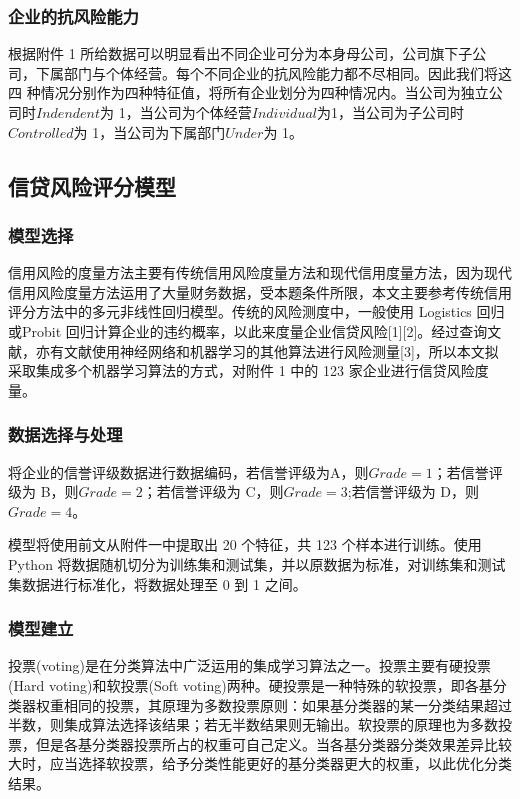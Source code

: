 \documentclass[UTF8]{ctexart}
\begin{document}
\subsubsection{企业的抗风险能力}

根据附件 1 所给数据可以明显看出不同企业可分为本身母公司，公司旗下子公
司，下属部门与个体经营。每个不同企业的抗风险能力都不尽相同。因此我们将这四
种情况分别作为四种特征值，将所有企业划分为四种情况内。当公司为独立公司时$Indendent$为 1，当公司为个体经营$Individual$为1，当公司为子公司时$Controlled$为 1，当公司为下属部门$Under$为 1。

\subsection{信贷风险评分模型}

\subsubsection{模型选择}

信用风险的度量方法主要有传统信用风险度量方法和现代信用度量方法，因为现代信用风险度量方法运用了大量财务数据，受本题条件所限，本文主要参考传统信用评分方法中的多元非线性回归模型。传统的风险测度中，一般使用 Logistics 回归或Probit 回归计算企业的违约概率，以此来度量企业信贷风险[1][2]。经过查询文献，亦有文献使用神经网络和机器学习的其他算法进行风险测量[3]，所以本文拟采取集成多个机器学习算法的方式，对附件 1 中的 123 家企业进行信贷风险度量。

\subsubsection{数据选择与处理}

将企业的信誉评级数据进行数据编码，若信誉评级为A，则$Grade=1$；若信誉评级为 B，则$Grade=2$；若信誉评级为 C，则$Grade=3$;若信誉评级为 D，则$Grade=4$。

模型将使用前文从附件一中提取出 20 个特征，共 123 个样本进行训练。使用Python 将数据随机切分为训练集和测试集，并以原数据为标准，对训练集和测试集数据进行标准化，将数据处理至 0 到 1 之间。

\subsubsection{模型建立}

投票(voting)是在分类算法中广泛运用的集成学习算法之一。投票主要有硬投票(Hard voting)和软投票(Soft voting)两种。硬投票是一种特殊的软投票，即各基分类器权重相同的投票，其原理为多数投票原则：如果基分类器的某一分类结果超过半数，则集成算法选择该结果；若无半数结果则无输出。软投票的原理也为多数投票，但是各基分类器投票所占的权重可自己定义。当各基分类器分类效果差异比较大时，应当选择软投票，给予分类性能更好的基分类器更大的权重，以此优化分类结果。
\end{document}
